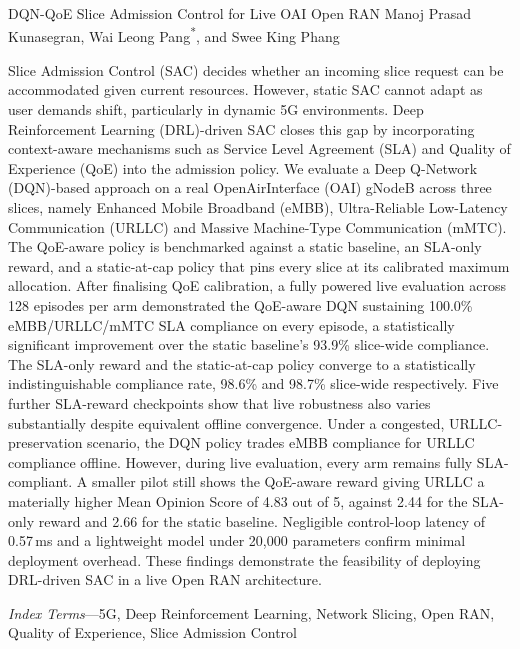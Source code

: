 \documentclass[10pt]{article}
\begin{document}
\CACSmaketitle
  {DQN-QoE Slice Admission Control for Live OAI Open RAN}
  {Manoj Prasad Kunasegran, Wai Leong Pang\textsuperscript{*}, and Swee King Phang}

\begin{CACSabstract}
\abstractnameCACS
Slice Admission Control (SAC) decides whether an incoming slice request can be accommodated given
current resources. However, static SAC cannot adapt as user demands shift, particularly in dynamic 5G environments.
Deep Reinforcement Learning (DRL)-driven SAC closes
this gap by incorporating context-aware mechanisms such as Service Level Agreement (SLA) and Quality of Experience (QoE) into the admission policy. We evaluate a Deep Q-Network (DQN)-based approach on a real OpenAirInterface (OAI)
gNodeB across three slices, namely Enhanced Mobile Broadband
(eMBB), Ultra-Reliable Low-Latency Communication (URLLC) and Massive
Machine-Type Communication (mMTC). The QoE-aware policy is
benchmarked against a static baseline, an SLA-only reward,
and a static-at-cap policy that pins every slice at its calibrated
maximum allocation. After finalising QoE calibration, a
fully powered live evaluation across 128 episodes per arm demonstrated
the QoE-aware DQN sustaining 100.0\% eMBB/URLLC/mMTC SLA compliance
on every episode, a statistically significant improvement over the
static baseline's 93.9\% slice-wide compliance. The SLA-only reward
and the static-at-cap policy converge to a statistically
indistinguishable compliance rate, 98.6\% and 98.7\% slice-wide
respectively. Five further SLA-reward checkpoints
show that live robustness also varies substantially despite
equivalent offline convergence. Under a congested,
URLLC-preservation scenario, the DQN policy trades eMBB compliance
for URLLC compliance offline. However, during live evaluation, every arm remains fully
SLA-compliant. A smaller pilot still shows the QoE-aware reward
giving URLLC a materially higher Mean Opinion Score of 4.83 out of
5, against 2.44 for the SLA-only reward and 2.66 for the static
baseline. Negligible control-loop latency of 0.57\,ms and a
lightweight model under 20,000 parameters confirm minimal deployment
overhead. These findings demonstrate the feasibility of deploying DRL-driven SAC in a live Open RAN architecture.
\end{CACSabstract}

\begin{center}
\parbox{0.94\columnwidth}{\fontsize{9}{10.5}\selectfont\noindent
\textit{Index Terms}---5G, Deep Reinforcement Learning, Network Slicing, Open RAN, Quality of Experience, Slice Admission Control}
\end{center}
\end{document}
